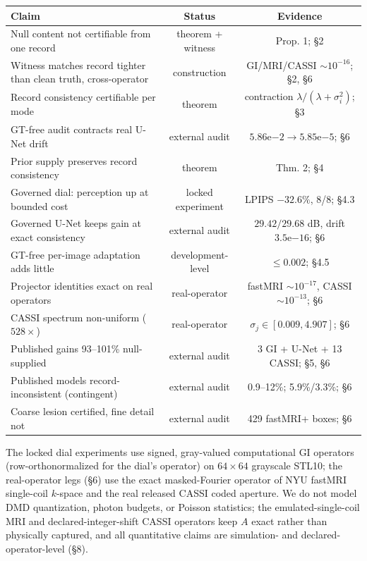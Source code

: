 \documentclass[11pt]{article}
\begin{document}
\begin{center}\begin{tabular}{lcc}
\toprule
Claim & Status & Evidence \\
\midrule
Null content not certifiable from one record & theorem + witness & Prop. 1; §2 \\
Witness matches record tighter than clean truth, cross-operator & construction & GI/MRI/CASSI $\sim\!10^{-16}$; §2, §6 \\
Record consistency certifiable per mode & theorem & contraction $\lambda/(\lambda+\sigma_i^2)$; §3 \\
GT-free audit contracts real U-Net drift & external audit & $5.86\mathrm{e}{-2}\!\to\!5.85\mathrm{e}{-5}$; §6 \\
Prior supply preserves record consistency & theorem & Thm. 2; §4 \\
Governed dial: perception up at bounded cost & locked experiment & LPIPS $-32.6\%$, 8/8; §4.3 \\
Governed U-Net keeps gain at exact consistency & external audit & $29.42/29.68$ dB, drift $3.5\mathrm{e}{-16}$; §6 \\
GT-free per-image adaptation adds little & development-level & $\le 0.002$; §4.5 \\
Projector identities exact on real operators & real-operator & fastMRI $\sim\!10^{-17}$, CASSI $\sim\!10^{-13}$; §6 \\
CASSI spectrum non-uniform ($528\times$) & real-operator & $\sigma_j \in [0.009, 4.907]$; §6 \\
Published gains 93--101\% null-supplied & external audit & 3 GI + U-Net + 13 CASSI; §5, §6 \\
Published models record-inconsistent (contingent) & external audit & 0.9--12\%; 5.9\%/3.3\%; §6 \\
Coarse lesion certified, fine detail not & external audit & 429 fastMRI+ boxes; §6 \\
\bottomrule
\end{tabular}\end{center}

The locked dial experiments use signed, gray-valued computational GI operators (row-orthonormalized for the dial's operator) on $64\times64$ grayscale STL10; the real-operator legs (§6) use the exact masked-Fourier operator of NYU fastMRI single-coil $k$-space and the real released CASSI coded aperture. We do not model DMD quantization, photon budgets, or Poisson statistics; the emulated-single-coil MRI and declared-integer-shift CASSI operators keep $A$ exact rather than physically captured, and all quantitative claims are simulation- and declared-operator-level (§8).
\end{document}

